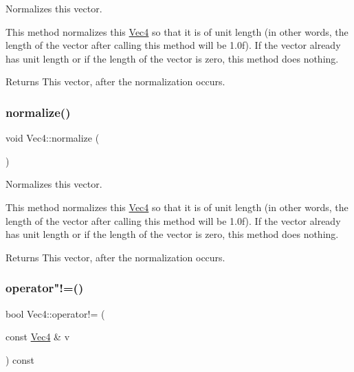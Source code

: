 Normalizes this vector.

This method normalizes this \hyperlink{classVec4}{Vec4} so that it is of unit length (in other words, the length of the vector after calling this method will be 1.\+0f). If the vector already has unit length or if the length of the vector is zero, this method does nothing.

\begin{DoxyReturn}{Returns}
This vector, after the normalization occurs. 
\end{DoxyReturn}
\mbox{\label{classVec4_aecf9d5a3003c2a443098b4d80bc9dea6}} 
\subsubsection{\texorpdfstring{normalize()}{normalize()}\hspace{0.1cm}{\footnotesize\ttfamily [2/2]}}
{\footnotesize\ttfamily void Vec4\+::normalize (\begin{DoxyParamCaption}{ }\end{DoxyParamCaption})}

Normalizes this vector.

This method normalizes this \hyperlink{classVec4}{Vec4} so that it is of unit length (in other words, the length of the vector after calling this method will be 1.\+0f). If the vector already has unit length or if the length of the vector is zero, this method does nothing.

\begin{DoxyReturn}{Returns}
This vector, after the normalization occurs. 
\end{DoxyReturn}
\mbox{\label{classVec4_a3b6232cb8bef92bc2137590dace24c61}} 
\subsubsection{\texorpdfstring{operator"!=()}{operator!=()}\hspace{0.1cm}{\footnotesize\ttfamily [1/2]}}
{\footnotesize\ttfamily bool Vec4\+::operator!= (\begin{DoxyParamCaption}\item[{const \hyperlink{classVec4}{Vec4} \&}]{v }\end{DoxyParamCaption}) const\hspace{0.3cm}{\ttfamily [inline]}}

